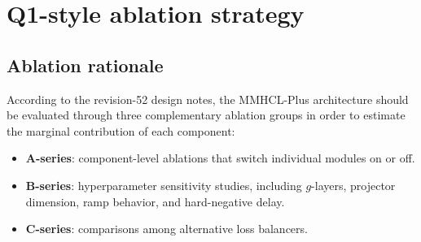 \documentclass[11pt,a4paper]{article}
\begin{document}
\section{Q1-style ablation strategy}
\subsection{Ablation rationale}
According to the revision-52 design notes, the MMHCL-Plus architecture should be evaluated through three complementary ablation groups in order to estimate the marginal contribution of each component:
\begin{itemize}[leftmargin=1.5em]
\item \textbf{A-series}: component-level ablations that switch individual modules on or off.
\item \textbf{B-series}: hyperparameter sensitivity studies, including \(g\)-layers, projector dimension, ramp behavior, and hard-negative delay.
\item \textbf{C-series}: comparisons among alternative loss balancers.
\end{itemize}
\end{document}
